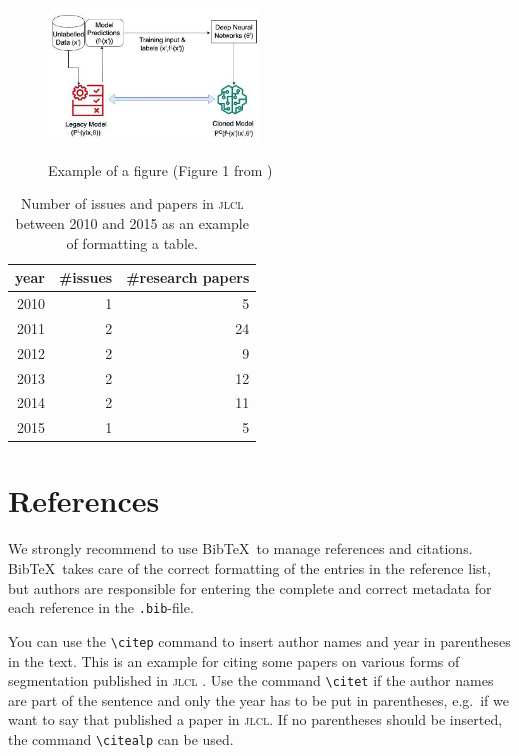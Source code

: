 \documentclass{jlcl}
\begin{document}
\begin{figure}[h]
\centering
\includegraphics[width=0.5\textwidth]{Example_fig.jpg}
\label{fig:modelclone}
\caption{Example of a figure (Figure 1 from \citealp{aggarwal-zesch-2022-bye}) }
\end{figure}

\begin{table}[htb]
\centering
\caption{Number of issues and papers in \textsc{jlcl} between 2010 and 2015 as an example of formatting a table.}
\label{tab:numberOfPapers}
\begin{tabular}{rrr}
\toprule
year & \#issues  & \#research papers \\
\midrule
2010 & 1 & 5 \\
2011 & 2 & 24 \\
2012 & 2 & 9\\
2013 & 2 & 12\\
2014 & 2 & 11 \\
2015 & 1 & 5 \\
\bottomrule
\end{tabular}
\end{table}






\section{References}

We strongly recommend to use Bib\!\TeX\ to manage references and citations. Bib\!\TeX\  takes care of the correct formatting of the entries in the reference list, but authors are responsible for entering the complete and correct metadata for each reference in the \texttt{.bib}-file.

You can use the \texttt{\textbackslash citep} command to insert author names and year in parentheses in the text. This is an example for citing some papers on various forms of segmentation published in \textsc{jlcl}
\citep{Riedl_Biemann_2012, Jurish_Würzner_2013, Sidarenka_Peldszus_Stede_2015}.
Use the command  \texttt{\textbackslash citet} if the author names are part of the sentence and only the year has to be put in parentheses, e.g.\ if we want to say that \citet{Jurish_Würzner_2013} published a paper in \textsc{jlcl}. If no parentheses should be inserted, the command \texttt{\textbackslash citealp}  can be used.
\end{document}
